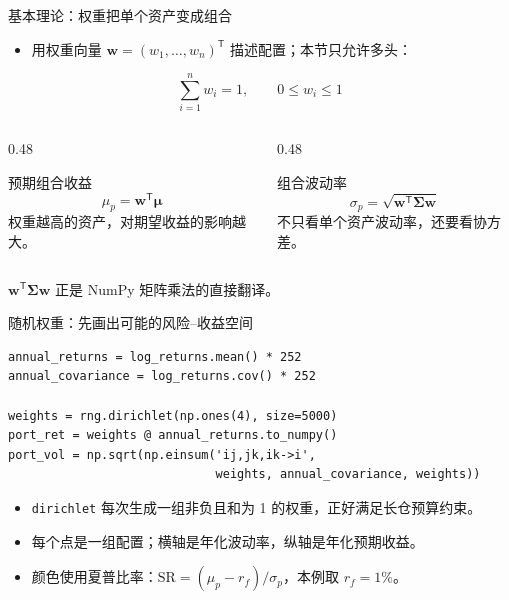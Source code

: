 \documentclass[9pt]{ctexbeamer}
\begin{document}
\begin{frame}{基本理论：权重把单个资产变成组合}
  \begin{itemize}
    \item 用权重向量 $\bm{w}=(w_1,\dots,w_n)^\mathsf{T}$ 描述配置；本节只允许多头：
  \end{itemize}
  \begin{equation*}
    \sum_{i=1}^n w_i=1,\qquad 0\leq w_i\leq 1
  \end{equation*}
  \begin{columns}[T,totalwidth=\textwidth]
    \begin{column}{0.48\textwidth}
      \begin{block}{预期组合收益}
        \begin{equation*}
          \mu_p=\bm{w}^\mathsf{T}\bm{\mu}
        \end{equation*}
        权重越高的资产，对期望收益的影响越大。
      \end{block}
    \end{column}
    \begin{column}{0.48\textwidth}
      \begin{block}{组合波动率}
        \begin{equation*}
          \sigma_p=\sqrt{\bm{w}^\mathsf{T}\bm{\Sigma}\bm{w}}
        \end{equation*}
        不只看单个资产波动率，还要看\alert{协方差}。
      \end{block}
    \end{column}
  \end{columns}
  \vspace{0.5em}
  \begin{center}
    $\bm{w}^\mathsf{T}\bm{\Sigma}\bm{w}$ 正是 NumPy 矩阵乘法的直接翻译。\citep{hilpisch2018python}
  \end{center}
\end{frame}

\begin{frame}[fragile]{随机权重：先画出可能的风险--收益空间}
\begin{lstlisting}
annual_returns = log_returns.mean() * 252
annual_covariance = log_returns.cov() * 252

weights = rng.dirichlet(np.ones(4), size=5000)
port_ret = weights @ annual_returns.to_numpy()
port_vol = np.sqrt(np.einsum('ij,jk,ik->i',
                             weights, annual_covariance, weights))
\end{lstlisting}
  \begin{itemize}
    \item \texttt{dirichlet} 每次生成一组非负且和为 1 的权重，正好满足长仓预算约束。
    \item 每个点是一组配置；横轴是年化波动率，纵轴是年化预期收益。
    \item 颜色使用夏普比率：$\mathrm{SR}=(\mu_p-r_f)/\sigma_p$，本例取 $r_f=1\%$。
  \end{itemize}
\end{frame}
\end{document}
